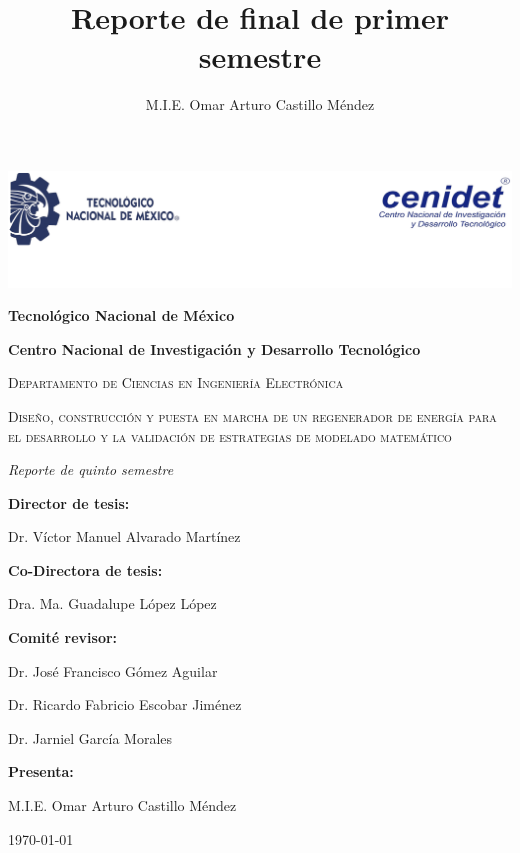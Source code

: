 \documentclass[12pt,letterpaper,final]{article}%
\title{Reporte de final de primer semestre}
\date{}
\author{M.I.E. Omar Arturo Castillo M\'endez}
\begin{document}
	\begin{titlepage}%
		\centering
		\includegraphics[scale=1]{logo}
		\vspace{0.1cm}
		{\bfseries\LARGE Tecnol\'ogico Nacional de M\'exico \par}
		{\bfseries\LARGE Centro Nacional de Investigaci\'on y Desarrollo Tecnol\'ogico \par}
		\vspace{0.25cm}
		{\scshape\Large Departamento de Ciencias en Ingenier\'ia Electr\'onica \par}
		\vspace{0.25cm}
		{\scshape\Large Diseño, construcci\'on y puesta en marcha de un regenerador de energ\'ia para el desarrollo y la validaci\'on de estrategias de modelado matem\'atico \par}
		\vspace{0.25cm}
		{\itshape\Large Reporte de quinto semestre  \par}
		\vspace{0.25cm}
		{\bfseries Director de tesis: \par}
		\vspace{0.2cm}
		{Dr. V\'ictor Manuel Alvarado Mart\'inez \par}
		\vspace{0.2cm}
		{\bfseries Co-Directora de tesis: \par}
		\vspace{0.2cm}
		{Dra. Ma. Guadalupe L\'opez L\'opez \par}
		\vspace{0.2cm}
		{\bfseries Comit\'e revisor: \par}
		\vspace{0.2cm}
		{Dr. Jos\'e Francisco G\'omez Aguilar \par}
		\vspace{0.2cm}
		{Dr. Ricardo Fabricio Escobar Jim\'enez  \par}
		\vspace{0.2cm}
		{Dr. Jarniel Garc\'ia Morales \par}
		\vspace{0.2cm}
		{\bfseries Presenta: \par}
		{M.I.E. Omar Arturo Castillo M\'endez \par}
		\vspace{0.2cm}
		{\today \par}
	\end{titlepage}
	\tableofcontents{\thispagestyle{empty}}
	\newpage
	\setcounter{page}{1}
\end{document}
